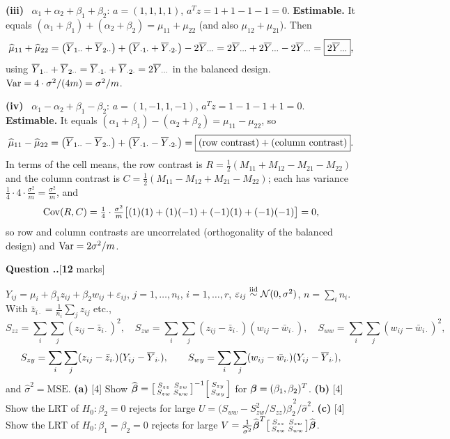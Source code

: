 \documentclass[11pt]{article}
\newcommand{\wh}[1]{\widehat{#1}}
\newcommand{\MSE}{\mathrm{MSE}}
\newcounter{qq}[section]
\newcommand{\qhead}[2]{\medskip\refstepcounter{qq}%
  \noindent\textbf{\color{Blue}Question \thesection.\theqq.}\hfill\textnormal{[\textbf{#1} marks]}%
  \ifx\relax#2\relax\else\par\smallskip\fi}
\newcommand{\pt}[1]{\smallskip\noindent\textbf{(#1)}\ }
\begin{document}
\pt{iii} $\alpha_1+\alpha_2+\beta_1+\beta_2$: $a=(1,1,1,1)$, $a^Tz=1+1-1-1=0$.
\textbf{Estimable.} It equals $(\alpha_1+\beta_1)+(\alpha_2+\beta_2)=\mu_{11}+\mu_{22}$
(and also $\mu_{12}+\mu_{21}$). Then
\[
  \wh\mu_{11}+\wh\mu_{22}
  =\big(\Ybar_{1\cdot\cdot}+\Ybar_{2\cdot\cdot}\big)+\big(\Ybar_{\cdot1\cdot}+\Ybar_{\cdot2\cdot}\big)-2\Ybar_{\cdots}
  =2\Ybar_{\cdots}+2\Ybar_{\cdots}-2\Ybar_{\cdots}
  =\boxed{2\Ybar_{\cdots}},
\]
using $\overline{Y}_{1\cdot\cdot}+\overline{Y}_{2\cdot\cdot}=\overline{Y}_{\cdot1\cdot}+\overline{Y}_{\cdot2\cdot}=2\overline{Y}_{\cdots}$
in the balanced design. $\operatorname{Var}=4\cdot\sigma^2/(4m)=\sigma^2/m$.

\pt{iv} $\alpha_1-\alpha_2+\beta_1-\beta_2$: $a=(1,-1,1,-1)$, $a^Tz=1-1-1+1=0$.
\textbf{Estimable.} It equals $(\alpha_1+\beta_1)-(\alpha_2+\beta_2)=\mu_{11}-\mu_{22}$, so
\[
  \wh\mu_{11}-\wh\mu_{22}
  =\big(\Ybar_{1\cdot\cdot}-\Ybar_{2\cdot\cdot}\big)+\big(\Ybar_{\cdot1\cdot}-\Ybar_{\cdot2\cdot}\big)
  =\boxed{\text{(row contrast)}+\text{(column contrast)}} .
\]
In terms of the cell means, the row contrast is $R=\tfrac12(M_{11}+M_{12}-M_{21}-M_{22})$ and
the column contrast is $C=\tfrac12(M_{11}-M_{12}+M_{21}-M_{22})$; each has variance
$\tfrac14\cdot4\cdot\tfrac{\sigma^2}{m}=\tfrac{\sigma^2}{m}$, and
\[
  \operatorname{Cov}(R,C)=\tfrac14\cdot\tfrac{\sigma^2}{m}\big[(1)(1)+(1)(-1)+(-1)(1)+(-1)(-1)\big]=0 ,
\]
so row and column contrasts are uncorrelated (orthogonality of the balanced design) and
$\operatorname{Var}=2\sigma^2/m$.

\qhead{12}{}
\begin{stmt}
$Y_{ij}=\mu_i+\beta_1z_{ij}+\beta_2w_{ij}+\varepsilon_{ij}$, $j=1,\dots,n_i$, $i=1,\dots,r$,
$\varepsilon_{ij}\overset{\text{iid}}{\sim}\mathcal{N}(0,\sigma^2)$, $n=\sum_in_i$. With
$\bar z_{i\cdot}=\tfrac1{n_i}\sum_jz_{ij}$ etc.,
\[
  S_{zz}=\sum_i\sum_j(z_{ij}-\bar z_{i\cdot})^2,\quad
  S_{zw}=\sum_i\sum_j(z_{ij}-\bar z_{i\cdot})(w_{ij}-\bar w_{i\cdot}),\quad
  S_{ww}=\sum_i\sum_j(w_{ij}-\bar w_{i\cdot})^2,
\]
\[
  S_{zy}=\sum_i\sum_j(z_{ij}-\bar z_{i\cdot})(Y_{ij}-\overline{Y}_{i\cdot}),\qquad
  S_{wy}=\sum_i\sum_j(w_{ij}-\bar w_{i\cdot})(Y_{ij}-\overline{Y}_{i\cdot}),
\]
and $\wh\sigma^2=\MSE$.
\textbf{(a)} [4] Show $\wh\bb=\begin{bsmallmatrix}S_{zz}&S_{zw}\\S_{zw}&S_{ww}\end{bsmallmatrix}^{-1}\begin{bsmallmatrix}S_{zy}\\S_{wy}\end{bsmallmatrix}$ for $\boldsymbol{\beta}=(\beta_1,\beta_2)^T$.
\textbf{(b)} [4] Show the LRT of $H_0:\beta_2=0$ rejects for large
$U=\big(S_{ww}-S_{zw}^2/S_{zz}\big)\wh\beta_2^{\,2}/\wh\sigma^2$.
\textbf{(c)} [4] Show the LRT of $H_0:\beta_1=\beta_2=0$ rejects for large
$V=\tfrac1{\wh\sigma^2}\wh\bb^T\begin{bsmallmatrix}S_{zz}&S_{zw}\\S_{zw}&S_{ww}\end{bsmallmatrix}\wh\bb$.
\end{stmt}
\end{document}

